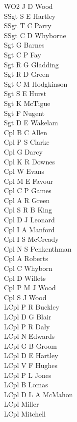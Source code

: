\begin{multicols}{2}
  \noindent
  WO2 J D Wood \\
  SSgt S E Hartley \\
  SSgt T C Parry \\
  SSgt C D Whyborne \\
  Sgt G Barnes \\
  Sgt C P Fay \\
  Sgt R G Gladding \\
  Sgt R D Green \\
  Sgt C M Hodgkinson \\
  Sgt S E Hurst \\
  Sgt K McTigue \\
  Sgt F Nugent \\
  Sgt D E Wakelam \\
  Cpl B C Allen \\
  Cpl P S Clarke \\
  Cpl G Darcy \\
  Cpl K R Downes \\
  Cpl W Evans \\
  Cpl M E Favour \\
  Cpl C P Games \\
  Cpl A R Green \\
  Cpl S R B King \\
  Cpl D J Leonard \\
  Cpl I A Manford \\
  Cpl I S McCready \\
  Cpl N S Penkenthman \\
  Cpl A Roberts \\
  Cpl C Whyborn \\
  Cpl D Willets \\
  Cpl P M J Wood \\
  Cpl S J Wood \\
  LCpl P R Buckley \\
  LCpl D G Blair \\
  LCpl P R Daly \\
  LCpl N Edwards \\
  LCpl G B Groom \\
  LCpl D E Hartley \\
  LCpl V F Hughes \\
  LCpl P L Jones \\
  LCpl B Lomas \\
  LCpl D L A McMahon \\
  LCpl Miller \\
  LCpl Mitchell \\

\end{multicols}
